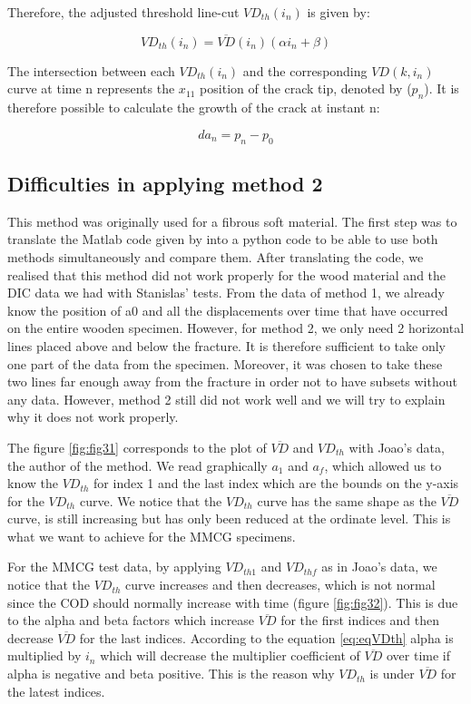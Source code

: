 Therefore, the adjusted threshold line-cut $VD_{th}(i_n)$ is given by:

\begin{equation}
	VD_{th}(i_n)=\overline{VD}(i_n)(\alpha i_n +\beta)
	\label{eq:eqVDth}
\end{equation}

The intersection between each $VD_{th}(i_n)$ and the corresponding $VD(k, i_n)$ curve at time n represents the $x_{11}$ position of the crack tip, denoted by ($p_n$).
It is therefore possible to calculate the growth of the crack at instant n:

\begin{equation}
	da_n=p_n-p_0
\end{equation}

\subsection{Difficulties in applying method 2}

This method was originally used for a fibrous soft material. The first step was to translate the Matlab code given by \cite{FilhoJ2022} into a python code to be able to use both methods simultaneously and compare them.
After translating the code, we realised that this method did not work properly for the wood material and the DIC data we had with Stanislas' tests.
From the data of method 1, we already know the position of a0 and all the displacements over time that have occurred on the entire wooden specimen. However, for method 2, we only need 2 horizontal lines placed above and below the fracture. It is therefore sufficient to take only one part of the data from the specimen. Moreover, it was chosen to take these two lines far enough away from the fracture in order not to have subsets without any data.
However, method 2 still did not work well and we will try to explain why it does not work properly.

The figure \ref{fig:fig31} corresponds to the plot of $\overline{VD}$ and $VD_{th}$ with Joao's data, the author of the method. We read graphically $a_1$ and $a_f$, which allowed us to know the $VD_{th}$ for index 1 and the last index which are the bounds on the y-axis for the $VD_{th}$ curve. We notice that the $VD_{th}$ curve has the same shape as the $\overline{VD}$ curve, is still increasing but has only been reduced at the ordinate level. This is what we want to achieve for the MMCG specimens.

For the MMCG test data, by applying $VD_{th1}$ and $VD_{thf}$ as in Joao's data, we notice that the $VD_{th}$ curve increases and then decreases, which is not normal since the COD should normally increase with time (figure \ref{fig:fig32}). This is due to the alpha and beta factors which increase $\overline{VD}$ for the first indices and then decrease $\overline{VD}$ for the last indices. According to the equation \ref{eq:eqVDth} alpha is multiplied by $i_n$ which will decrease the multiplier coefficient of $\overline{VD}$ over time if alpha is negative and beta positive. This is the reason why $VD_{th}$ is under $\overline{VD}$  for the latest indices.

